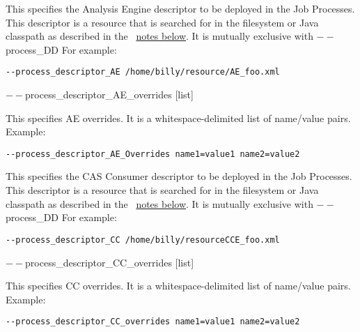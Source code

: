 \begin{description}
           \item[$--$process\_descriptor\_AE {[descriptor]}  ]

             This specifies the Analysis Engine descriptor to be deployed in the Job Processes. This 
             descriptor is a resource that is searched for in the filesystem or Java classpath as described 
             in the ~\hyperref[par:cli.submit.notes]{notes below}.
             It is mutually exclusive with $--$process\_DD For example: 
             \begin{verbatim}
--process_descriptor_AE /home/billy/resource/AE_foo.xml 
             \end{verbatim}


           \begin{sloppypar}
           \item[$--$process\_descriptor\_AE\_overrides {[list]}  ]

             This specifies AE overrides. It is a whitespace-delimited list of name/value pairs. Example: 
             \begin{verbatim}
--process_descriptor_AE_Overrides name1=value1 name2=value2 
             \end{verbatim}
           \end{sloppypar}             

           \item[$--$process\_descriptor\_CC {[descriptor]}  ]

             This specifies the CAS Consumer descriptor to be deployed in the Job Processes. This 
             descriptor is a resource that is searched for in the filesystem or Java classpath as described 
             in the ~\hyperref[par:cli.submit.notes]{notes below}.
             It is mutually exclusive with $--$process\_DD For example: 
             \begin{verbatim}
--process_descriptor_CC /home/billy/resourceCCE_foo.xml 
             \end{verbatim}

           \begin{sloppypar}             
           \item[$--$process\_descriptor\_CC\_overrides {[list]}  ]

             This specifies CC overrides. It is a whitespace-delimited list of name/value pairs. Example: 
             \begin{verbatim}
--process_descriptor_CC_overrides name1=value1 name2=value2 
             \end{verbatim}
           \end{sloppypar}             
           

\end{description}
